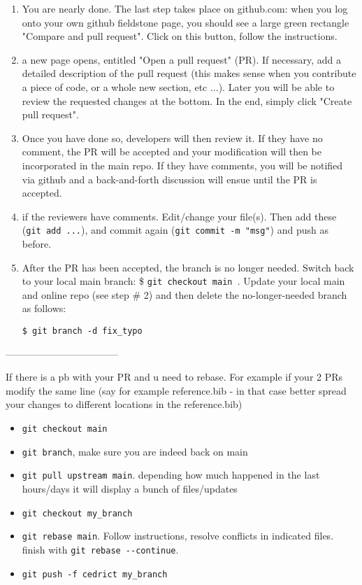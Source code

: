 \begin{enumerate}
\item You are nearly done. The last step takes place on github.com: when you log onto 
your own github fieldstone page, you should see a large green rectangle "Compare and pull request".
Click on this button, follow the instructions.

\item a new page opens, entitled "Open a pull request" (PR). If necessary, add a detailed description of 
the pull request (this makes sense when you contribute a piece of code, or a whole new section, etc ...).
Later you will be able to review the requested changes at the bottom. In the end, simply click "Create pull request".

\item Once you have done so, \aspect developers will then review it. 
If they have no comment, the PR will be accepted and your modification will 
then be incorporated in the main repo. If they have comments, you will be notified via github and a 
back-and-forth discussion will ensue until the PR is accepted. 

\item if the reviewers have comments. Edit/change your file(s). 
Then add these (\verb'git add ...'), and commit again (\verb'git commit -m "msg"')
and push as before. 



\item After the PR has been accepted, the branch is no longer needed. Switch back to your local main branch:
\$ \verb"git checkout main ".
Update your local main and online repo (see step \# 2) and then delete the no-longer-needed 
branch as follows:
\begin{verbatim}
$ git branch -d fix_typo
\end{verbatim}
\end{enumerate}

-----------------------------------

If there is a pb with your PR and u need to rebase. For example if your 2 PRs modify the same line (say for example reference.bib - 
in that case better spread your changes to different locations in the reference.bib)

\begin{itemize}
\item \verb'git checkout main'
\item \verb'git branch', make sure you are indeed back on main
\item \verb'git pull upstream main'. depending how much happened in the last hours/days it will display a bunch of files/updates
\item \verb'git checkout my_branch'
\item \verb'git rebase main'. Follow instructions, resolve conflicts in indicated files. finish with \verb'git rebase --continue'. 
\item \verb'git push -f cedrict my_branch'
\end{itemize}

